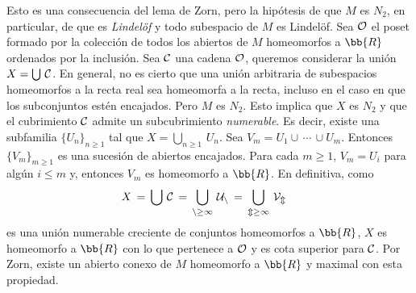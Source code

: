 Esto es una consecuencia del lema de Zorn, pero la hip\'{o}tesis
de que $M$ es $N_{2}$, en particular, de que es \emph{Lindel\"{o}f} y todo
subespacio de $M$ es Lindel\"{o}f. Sea $\cal{O}$ el poset formado por
la colecci\'{o}n de todos los abiertos de $M$ homeomorfos a $\bb{R}$
ordenados por la inclusi\'{o}n. Sea $\cal{C}$ una cadena $\cal{O}$,
queremos considerar la uni\'{o}n $X=\bigcup\,\cal{C}$. En general, no es
cierto que una uni\'{o}n arbitraria de subespacios homeomorfos a la recta
real sea homeomorfa a la recta, incluso en el caso en que los subconjuntos
est\'{e}n encajados. Pero $M$ es $N_{2}$. Esto implica que $X$ es $N_{2}$
y que el cubrimiento $\cal{C}$ admite un subcubrimiento \emph{numerable}.
Es decir, existe una subfamilia $\{U_{n}\}_{n\geq 1}$ tal que
$X=\bigcup_{n\geq 1}\,U_{n}$. Sea $V_{m}=U_{1}\cup\,\cdots\,\cup U_{m}$.
Entonces $\{V_{m}\}_{m\geq 1}$ es una sucesi\'{o}n de abiertos encajados.
Para cada $m\geq 1$, $V_{m}=U_{i}$ para alg\'{u}n $i\leq m$ y, entonces
$V_{m}$ es homeomorfo a $\bb{R}$. En definitiva, como
\begin{align*}
	X & \,=\,\bigcup\,\cal{C} \,=\,\bigcup_{n\geq 1}\,U_{n}
	\,=\,\bigcup_{m\geq 1}\,V_{m}
\end{align*}
%
es una uni\'{o}n numerable creciente de conjuntos homeomorfos a $\bb{R}$,
$X$ es homeomorfo a $\bb{R}$ con lo que pertenece a $\cal{O}$ y es
cota superior para $\cal{C}$. Por Zorn, existe un abierto conexo de $M$
homeomorfo a $\bb{R}$ y maximal con esta propiedad.

